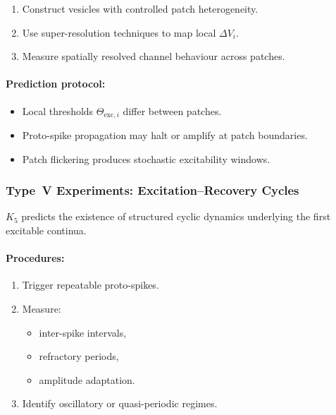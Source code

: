 \begin{enumerate}
    \item Construct vesicles with controlled patch heterogeneity.
    \item Use super-resolution techniques to map local $\Delta V_i$.
    \item Measure spatially resolved channel behaviour across patches.
\end{enumerate}

\paragraph{Prediction protocol:}

\begin{itemize}
    \item Local thresholds $\Theta_{\mathrm{exc},i}$ differ between patches.
    \item Proto-spike propagation may halt or amplify at patch boundaries.
    \item Patch flickering produces stochastic excitability windows.
\end{itemize}



\subsubsection{Type~V Experiments: Excitation--Recovery Cycles}

$K_5$ predicts the existence of structured cyclic dynamics 
underlying the first excitable continua.

\paragraph{Procedures:}

\begin{enumerate}
    \item Trigger repeatable proto-spikes.
    \item Measure:
          \begin{itemize}
              \item inter-spike intervals,
              \item refractory periods,
              \item amplitude adaptation.
          \end{itemize}
    \item Identify oscillatory or quasi-periodic regimes.
\end{enumerate}


